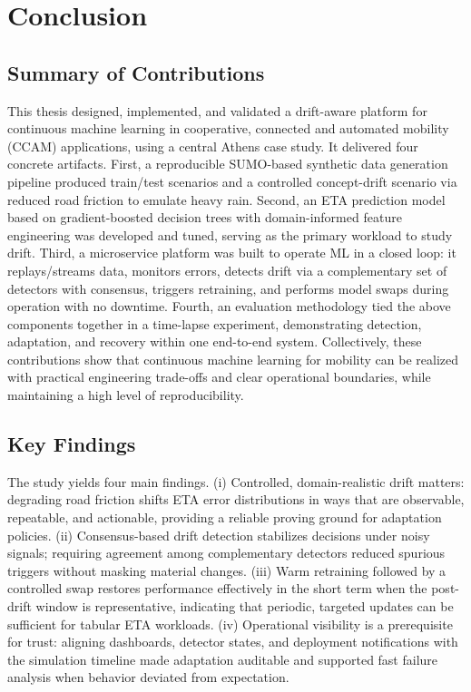 \chapter{Conclusion}
\label{ch:conclusion}

\section{Summary of Contributions}
This thesis designed, implemented, and validated a drift-aware platform for continuous machine learning in cooperative, connected and automated mobility (CCAM) applications, using a central Athens case study.
It delivered four concrete artifacts.
First, a reproducible SUMO-based synthetic data generation pipeline produced train/test scenarios and a controlled concept-drift scenario via reduced road friction to emulate heavy rain.
Second, an ETA prediction model based on gradient-boosted decision trees with domain-informed feature engineering was developed and tuned, serving as the primary workload to study drift.
Third, a microservice platform was built to operate ML in a closed loop: it replays/streams data, monitors errors, detects drift via a complementary set of detectors with consensus, triggers retraining, and performs model swaps during operation with no downtime.
Fourth, an evaluation methodology tied the above components together in a time-lapse experiment, demonstrating detection, adaptation, and recovery within one end-to-end system.
Collectively, these contributions show that continuous machine learning for mobility can be realized with practical engineering trade-offs and clear operational boundaries, while maintaining a high level of reproducibility.

\section{Key Findings}
The study yields four main findings.
(i) Controlled, domain-realistic drift matters: degrading road friction shifts ETA error distributions in ways that are observable, repeatable, and actionable, providing a reliable proving ground for adaptation policies.
(ii) Consensus-based drift detection stabilizes decisions under noisy signals; requiring agreement among complementary detectors reduced spurious triggers without masking material changes.
(iii) Warm retraining followed by a controlled swap restores performance effectively in the short term when the post-drift window is representative, indicating that periodic, targeted updates can be sufficient for tabular ETA workloads.
(iv) Operational visibility is a prerequisite for trust: aligning dashboards, detector states, and deployment notifications with the simulation timeline made adaptation auditable and supported fast failure analysis when behavior deviated from expectation.

